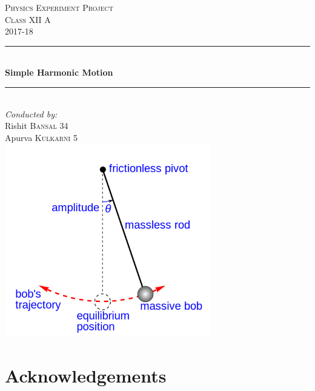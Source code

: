 \documentclass[12pt, twoside]{report}
\numberwithin{equation}{section}
\begin{document}
\begin{titlepage}
  
\newcommand{\HRule}{\rule{\linewidth}{0.5mm}}

\center
\vspace*{3cm} 

\textsc{\LARGE Physics Experiment Project}\\[1.5cm]
\textsc{\Large Class XII A}\\[0.5cm]
\textsc{\large 2017-18}\\[0.5cm]


\HRule \\[0.4cm]
{ \huge \bfseries Simple Harmonic Motion}\\[0.4cm]
\HRule \\[1.5cm]
 

\Large \emph{Conducted by:}\\
\large Rishit \textsc{Bansal 34}\\
\large Apurva \textsc{Kulkarni 5}\\[2cm]

\includegraphics[width=9cm]{title2}
\vfill

\end{titlepage}
\cleardoublepage
\chapter{Acknowledgements}

\cleardoublepage
\tableofcontents
\cleardoublepage
\end{document}
